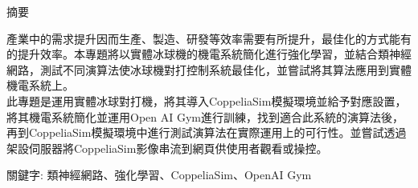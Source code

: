 \begin{center}
\fontsize{11pt}{16pt}\sectionef\hspace{12pt} 摘要
\end{center}
\begin{flushleft}
產業中的需求提升因而生產、製造、研發等效率需要有所提升，最佳化的方式能有的提升效率。本專題將以實體冰球機的機電系統簡化進行強化學習，並結合類神經網路，測試不同演算法使冰球機對打控制系統最佳化，並嘗試將其算法應用到實體機電系統上。\\[12pt]

此專題是運用實體冰球對打機，將其導入CoppeliaSim模擬環境並給予對應設置，將其機電系統簡化並運用Open AI Gym進行訓練，找到適合此系統的演算法後，再到CoppeliaSim模擬環境中進行測試演算法在實際運用上的可行性。並嘗試透過架設伺服器將CoppeliaSim影像串流到網頁供使用者觀看或操控。\\[12pt]

\end{flushleft}
\begin{center}
\fontsize{10pt}{20pt}\selectfont 關鍵字: 類神經網路、強化學習、\sectionef CoppeliaSim、OpenAI Gym
\end{center}